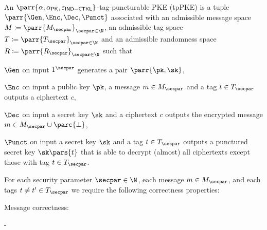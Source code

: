 \begin{definition}
    An \(\parr{\alpha,\alpha_{\mathsf{PK}},\varepsilon_{\mathsf{IND-CTKL}}}\)-tag-puncturable PKE (tpPKE) is a tuple \(\parr{\Gen,\Enc,\Dec,\Punct}\) associated with an admissible message space \(M \coloneqq \parr{M_\secpar}_{\secpar \in \N}\),
    an admissible tag space \(T \coloneqq \parr{T_\secpar}_{\secpar \in \N}\) and
    an admissible randomness space \(R \coloneqq \parr{R_\secpar}_{\secpar \in \N}\) such that
    \begin{sitemize}
        \item \(\Gen\) on input \(1^\secpar\) generates a pair \(\parr{\pk,\sk}\),
        \item \(\Enc\) on input a public key \(\pk\), a message \(m \in M_\secpar\) and a tag \(t \in T_\secpar\) outputs a ciphertext \(c\),
        \item \(\Dec\) on input a secret key \(\sk\) and a ciphertext \(c\) outputs the encrypted message \(m \in M_\secpar \cup \parc{\bot}\),
        \item \(\Punct\) on input a secret key \(\sk\) and a tag \(t \in T_\secpar\) outputs a punctured secret key \(\sk\pars{t}\) that is able to decrypt (almost) all ciphertexts except those with tag \(t \in T_\secpar\).
    \end{sitemize}
    For each security parameter \(\secpar \in \N\),
    each message \(m \in M_\secpar\),
    and each tags \(t \neq t' \in T_\secpar\) we require the following correctness properties:
    \begin{sitemize}
        \item Message correctness:
        \begin{bralign}
             - \alpha\parr{\secpar}
        \end{bralign}


\end{sitemize}
\end{definition}
